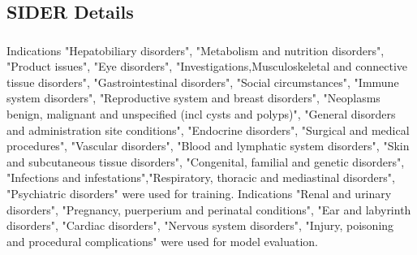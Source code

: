 \documentclass[journal=jacsat,manuscript=article]{achemso}
\providecommand{\DIFaddtex}[1]{{\protect\color{blue}\uwave{#1}}} %
\providecommand{\DIFaddbegin}{} %
\providecommand{\DIFaddend}{} %
\providecommand{\DIFadd}[1]{\texorpdfstring{\DIFaddtex{#1}}{#1}} %
\begin{document}
\DIFaddend \subsection{SIDER Details}
\DIFaddbegin \subsubsection{\DIFadd{Assay Details}}
\DIFaddend Indications "Hepatobiliary disorders", "Metabolism and nutrition disorders", "Product issues", "Eye disorders", "Investigations,Musculoskeletal and connective tissue disorders", "Gastrointestinal disorders", "Social circumstances", "Immune system disorders", "Reproductive system and breast disorders", "Neoplasms benign, malignant and unspecified (incl cysts and polyps)", "General disorders and administration site conditions", "Endocrine disorders", "Surgical and medical procedures", "Vascular disorders", "Blood and lymphatic system disorders", "Skin and subcutaneous tissue disorders", "Congenital, familial and genetic disorders", "Infections and infestations","Respiratory, thoracic and mediastinal disorders", "Psychiatric disorders" were used for training. Indications "Renal and urinary disorders", "Pregnancy, puerperium and perinatal conditions", "Ear and labyrinth disorders", "Cardiac disorders", "Nervous system disorders", "Injury, poisoning and procedural complications" were used for model evaluation.
\end{document}
